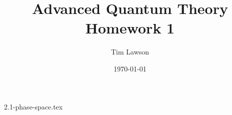 \documentclass[a4paper]{extarticle}
\title{Advanced Quantum Theory\\
\large Homework 1}
\author{Tim Lawson}
\date{\today}
\begin{document}
\maketitle

\setcounter{section}{2}
{2.1-phase-space.tex}
\end{document}
